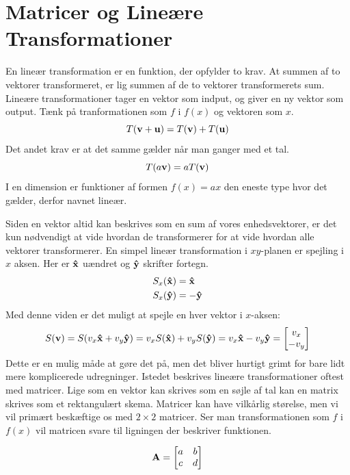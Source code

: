 \section{Matricer og Lineære Transformationer}

En lineær transformation er en funktion, der opfylder to krav. At summen af to vektorer transformeret, er lig summen af de to vektorer transformerets sum.
Lineære transformationer tager en vektor som indput, og giver en ny vektor som output. Tænk på tranformationen som $f$ i $f(x)$ og vektoren som $x$.
\begin{equation}
T(\mathbf{v}+\mathbf{u}) = T(\mathbf{v}) + T(\mathbf{u})
\end{equation}
Det andet krav er at det samme gælder når man ganger med et tal.
\begin{equation}
T(a\mathbf{v}) = aT(\mathbf{v})
\end{equation}
I en dimension er funktioner af formen $f(x) = ax$ den eneste type hvor det gælder, derfor navnet lineær.

Siden en vektor altid kan beskrives som en sum af vores enhedsvektorer, er det kun nødvendigt at vide hvordan de transformerer for at vide hvordan alle vektorer transformerer. En simpel lineær transformation i $xy$-planen er spejling i $x$ aksen. Her er $\mathbf{\hat{x}}$ uændret og $\mathbf{\hat{y}}$ skrifter fortegn.
\begin{align}
S_x(\mathbf{\hat{x}}) &= \mathbf{\hat{x}}\\
S_x(\mathbf{\hat{y}}) &= -\mathbf{\hat{y}}
\end{align}
Med denne viden er det muligt at spejle en hver vektor i $x$-aksen:
\begin{equation}
S(\mathbf{v}) = S(v_x\mathbf{\hat{x}}+v_y\mathbf{\hat{y}}) = v_xS(\mathbf{\hat{x}})+v_yS(\mathbf{\hat{y}}) = v_x\mathbf{\hat{x}}-v_y\mathbf{\hat{y}} = \begin{bmatrix} v_x \\ -v_y \end{bmatrix}
\end{equation}
Dette er en mulig måde at gøre det på, men det bliver hurtigt grimt for bare lidt mere komplicerede udregninger. Istedet beskrives lineære transformationer oftest med matricer. Lige som en vektor kan skrives som en søjle af tal kan en matrix skrives som et rektangulært skema. Matricer kan have vilkårlig størelse, men vi vil primært beskæftige os med $2\times 2$ matricer.
Ser man transformationen som $f$ i $f(x)$ vil matricen svare til ligningen der beskriver funktionen.

\begin{equation}
\mathbf{A}= \begin{bmatrix}
a & b\\c&d
\end{bmatrix}
\end{equation}

